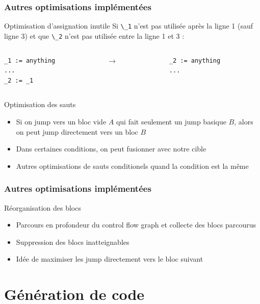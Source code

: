 \documentclass{beamer}
\newcommand*{\local}[1]{\lstinline|\_#1|}
\begin{document}
\begin{frame}[fragile]
    \frametitle{Autres optimisations implémentées}
    \begin{block}{Optimisation d'assignation inutile}
        Si \local{1} n'est pas utilisée après la ligne 1 (sauf ligne 3) et que \local{2} 
        n'est pas utilisée entre la ligne 1 et 3 :
        \begin{columns}
            \begin{column}{.40\textwidth}
                    \begin{lstlisting}
_1 := anything
...
_2 := _1
                    \end{lstlisting}
            \end{column}

            \begin{column}{.04\textwidth}
                $\rightarrow$
            \end{column}
            \begin{column}{.40\textwidth}
                    \begin{lstlisting}
_2 := anything
...
                    \end{lstlisting}
            \end{column}
        \end{columns}
    \end{block}
    \pause
    \begin{block}{Optimisation des sauts}
        \begin{itemize}
            \item Si on jump vers un bloc vide $A$ qui fait seulement un jump basique $B$, alors on peut jump directement vers un bloc $B$ 
            \item Dans certaines conditions, on peut fusionner avec notre cible
            \item Autres optimisations de sauts conditionels quand la condition est la même
        \end{itemize}
    \end{block}
\end{frame}

\begin{frame}
    \frametitle{Autres optimisations implémentées}

    \begin{block}{Réorganisation des blocs}
        \begin{itemize}
            \item Parcours en profondeur du control flow graph et collecte des blocs parcourus
            \item Suppression des blocs inatteignables
            \item Idée de maximiser les jump directement vers le bloc suivant
        \end{itemize}
        
    \end{block}
\end{frame}

\section{Génération de code}

\begin{frame}

\end{frame}
\end{document}
